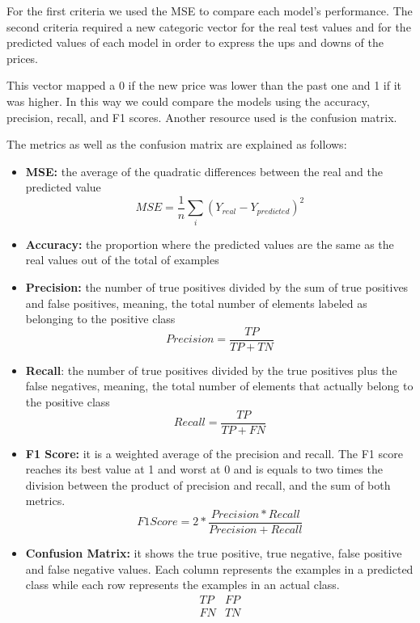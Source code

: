 For the first criteria we used the MSE to compare each model's performance. The second criteria required a new categoric vector for the real test values and for the predicted values of each model in order to express the ups and downs of the prices.

This vector mapped a 0 if the new price was lower than the past one and 1 if it was higher. In this way we could compare the models using the accuracy, precision, recall, and F1 scores. Another resource used is the confusion matrix. 

The metrics as well as the confusion matrix are explained as follows:

\begin{itemize}
\item \textbf{MSE:} the average of the quadratic differences between the real and the predicted value
\begin{equation}
MSE=\frac{1}{n}\sum_i (Y_{real}-Y_{predicted})^2
\label{eq:msemet}
\end{equation}
\item \textbf{Accuracy:} the proportion where the predicted values are the same as the real values out of the total of examples

\item \textbf{Precision:} the number of true positives divided by the sum of true positives and false positives, meaning, the total number of elements labeled as belonging to the positive class 
\begin{equation}
Precision=\frac{TP}{TP+TN}
\label{eq:precision}
\end{equation}
\item \textbf{Recall}: the number of true positives divided by the true positives plus the false negatives, meaning, the total number of elements that actually belong to the positive class
\begin{equation}
Recall=\frac{TP}{TP+FN}
\label{eq:recall}
\end{equation}
\item \textbf{F1 Score:} it is a weighted average of the precision and recall. The F1 score reaches its best value at 1 and worst at 0 and is equals to two times the division between the product of precision and recall, and the sum of both metrics.
\begin{equation}
F1 Score=2*\frac{Precision*Recall}{Precision+Recall}
\label{eq:fiscore}
\end{equation}
\item \textbf{Confusion Matrix:} it shows the true positive, true negative, false positive and false negative values. Each column represents the examples in a predicted class while each row represents the examples in an actual class.
$$
\begin{matrix}
TP&FP\\
FN&TN\\
\end{matrix}
$$
\end{itemize}

























